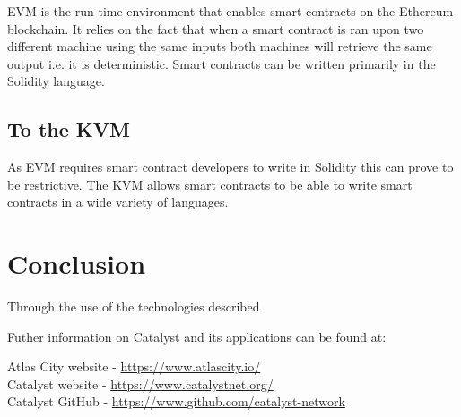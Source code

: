 \documentclass{article}
\begin{document}
EVM is the run-time environment that enables smart contracts on the Ethereum blockchain. It relies on the fact that when a smart contract is ran upon two different machine using the same inputs both machines will retrieve the same output i.e. it is deterministic. Smart contracts can be written primarily in the Solidity language.

\subsection{To the KVM}

As EVM requires smart contract developers to write in Solidity this can prove to be restrictive. The KVM allows smart contracts to be able to write smart contracts in a wide variety of languages. 






\section*{Conclusion}

Through the use of the technologies described

Futher information on Catalyst and its applications can be found at: \\
\begin{center}
Atlas City website - \url{https://www.atlascity.io/} \\
Catalyst website - \url{https://www.catalystnet.org/}\\
Catalyst GitHub - \url{https://www.github.com/catalyst-network}\\
\end{center}





\end{document}
